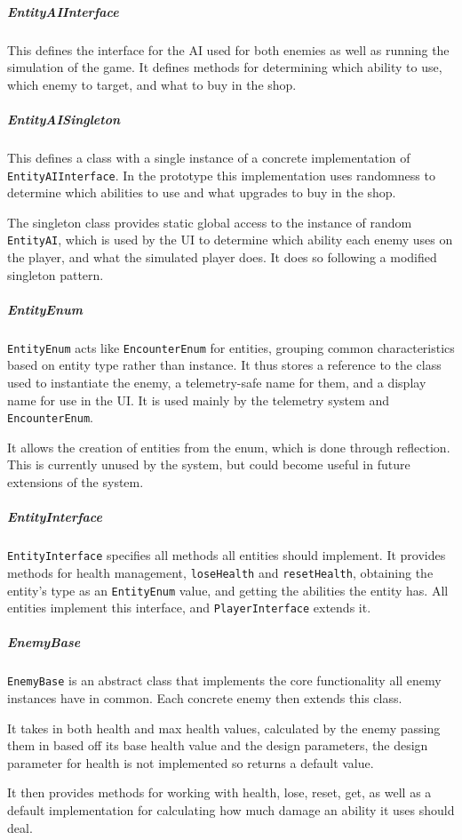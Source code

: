 \subparagraph{EntityAIInterface}
This defines the interface for the AI used for both enemies as well as running the simulation of the game. It defines methods for determining which ability to use, which enemy to target, and what to buy in the shop.

\subparagraph{EntityAISingleton}
This defines a class with a single instance of a concrete implementation of \texttt{EntityAIInterface}. In the prototype this implementation uses randomness to determine which abilities to use and what upgrades to buy in the shop.

The singleton class provides static global access to the instance of random \texttt{EntityAI}, which is used by the UI to determine which ability each enemy uses on the player, and what the simulated player does. It does so following a modified singleton pattern.

\subparagraph{EntityEnum}
\texttt{EntityEnum} acts like \texttt{EncounterEnum} for entities, grouping common characteristics based on entity type rather than instance. It thus stores a reference to the class used to instantiate the enemy, a telemetry-safe name for them, and a display name for use in the UI. It is used mainly by the telemetry system and \texttt{EncounterEnum}.

It allows the creation of entities from the enum, which is done through reflection. This is currently unused by the system, but could become useful in future extensions of the system.

\subparagraph{EntityInterface}
\texttt{EntityInterface} specifies all methods all entities should implement. It provides methods for health management, \texttt{loseHealth} and \texttt{resetHealth}, obtaining the entity's type as an \texttt{EntityEnum} value, and getting the abilities the entity has. All entities implement this interface, and \texttt{PlayerInterface} extends it.

\subparagraph{EnemyBase}
\texttt{EnemyBase} is an abstract class that implements the core functionality all enemy instances have in common. Each concrete enemy then extends this class.

It takes in both health and max health values, calculated by the enemy passing them in based off its base health value and the design parameters, the design parameter for health is not implemented so returns a default value.

It then provides methods for working with health, lose, reset, get, as well as a default implementation for calculating how much damage an ability it uses should deal.

